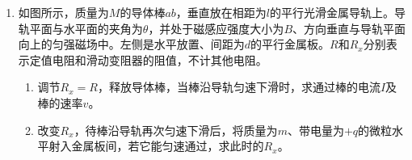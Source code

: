 \documentclass[\gkver]{gaokaozhenti}
\begin{document}
\begin{enumerate}
\begin{enumerate}
	表中有一个数值记录不规范，代表符号为\_\_\_\_\_\_\_。由表可知所用刻度尺的最小长度为\_\_\_\_\_\_。
	\item
	如图是该同学根据表中数据作的图，纵轴是砝码的质量，横轴是弹簧长度与\_\_\_\_\_\_\_\_\_的差值（填“$L_{0}$”或“$L_{1}$”）。
	\item
	由图可知弹簧的劲度系数为\_\_\_\_\_\_\_\_\_$\UNm$；通过图和表可知砝码盘的质量为\_\_\_\_\_\_\_\_\_$\Ug$（结果保留两位有效数字，重力加速度取 $9.8\Umsq$）。
\end{enumerate}

\item
如图所示，质量为$M$的导体棒$ab$，垂直放在相距为$l$的平行光滑金属导轨上。导轨平面与水平面的夹角为$\theta$，并处于磁感应强度大小为$B$、方向垂直与导轨平面向上的匀强磁场中。左侧是水平放置、间距为$d$的平行金属板。$R$和$R_{x}$分别表示定值电阻和滑动变阻器的阻值，不计其他电阻。
\begin{enumerate}
	\item
	调节$R_{x}=R$，释放导体棒，当棒沿导轨匀速下滑时，求通过棒的电流$I$及棒的速率$v$。
	\item
	改变$R_{x}$，待棒沿导轨再次匀速下滑后，将质量为$m$、带电量为$+q$的微粒水平射入金属板间，若它能匀速通过，求此时的$R_{x}$。
\end{enumerate}
\end{enumerate}
\end{document}
